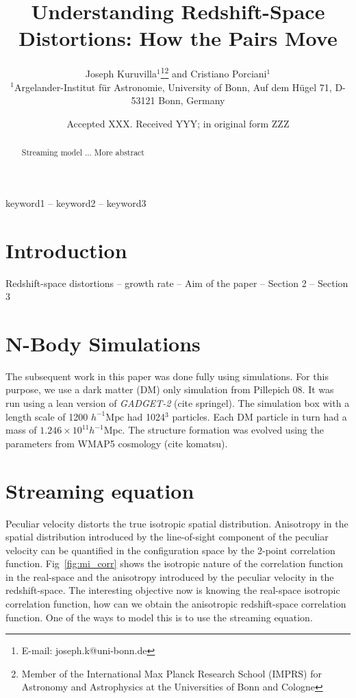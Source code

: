 \documentclass[a4paper,fleqn,usenatbib]{mnras}
\title[RSD: Streaming model]{Understanding Redshift-Space Distortions: How the Pairs Move}
\author[J. Kuruvilla and C. Porciani]{
	Joseph Kuruvilla$^{1}$\thanks{E-mail: joseph.k@uni-bonn.de}\thanks{Member of the International Max Planck Research School (IMPRS) for Astronomy and Astrophysics at the Universities of Bonn and Cologne} and
	Cristiano Porciani$^{1}$
	\\
	$^{1}$Argelander-Institut f\"ur Astronomie, University of Bonn, Auf dem H\"ugel 71, D-53121 Bonn, Germany
}
\date{Accepted XXX. Received YYY; in original form ZZZ}
\begin{document}
	\label{firstpage}
	\pagerange{\pageref{firstpage}--\pageref{lastpage}}
	\maketitle
	
	\begin{abstract}
		Streaming model ... More abstract
	\end{abstract}
	
	\begin{keywords}
		keyword1 -- keyword2 -- keyword3
	\end{keywords}
	
	
	
	\section{Introduction}
	\label{sec:intro}
	
	Redshift-space distortions -- growth rate -- Aim of the paper -- Section 2 -- Section 3 
	
	
	\section{N-Body Simulations}
	
	The subsequent work in this paper was done fully using simulations. For this purpose, we use a dark matter (DM) only simulation from Pillepich 08. It was run using a lean version of \emph{GADGET-2} (cite springel). The simulation box with a length scale of 1200 $h^{-1} \mathrm{Mpc}$ had 1024$^3$ particles. Each DM particle in turn had a mass of $1.246 \times 10^{11} h^{-1} \mathrm{Mpc}$. The structure formation was evolved using the parameters from WMAP5 cosmology (cite komatsu). 
	\section{Streaming equation}
	
	Peculiar velocity distorts the true isotropic spatial distribution. Anisotropy in the spatial distribution introduced by the line-of-sight component of the peculiar velocity can be quantified in the configuration space by the 2-point correlation function. Fig~\ref{fig:mi_corr} shows the isotropic nature of the correlation function in the real-space and the anisotropy introduced by the peculiar velocity in the redshift-space. The interesting objective now is knowing the real-space isotropic correlation function, how can we obtain the anisotropic redshift-space correlation function. One of the ways to model this is to use the streaming equation. 
	
\end{document}
